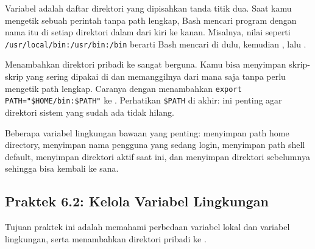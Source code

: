 Variabel  adalah daftar direktori yang dipisahkan tanda titik
dua. Saat kamu mengetik sebuah perintah tanpa path lengkap, Bash mencari
program dengan nama itu di setiap direktori dalam  dari kiri ke
kanan. Misalnya, nilai  seperti
\texttt{/usr/local/bin:/usr/bin:/bin} berarti Bash mencari di
 dulu, kemudian , lalu .

Menambahkan direktori pribadi ke  sangat berguna. Kamu bisa
menyimpan skrip-skrip yang sering dipakai di  dan memanggilnya
dari mana saja tanpa perlu mengetik path lengkap. Caranya dengan menambahkan
\texttt{export PATH="\$HOME/bin:\$PATH"} ke . Perhatikan
\texttt{\$PATH} di akhir: ini penting agar direktori sistem yang sudah ada
tidak hilang.

Beberapa variabel lingkungan bawaan yang penting:  menyimpan path
home directory,  menyimpan nama pengguna yang sedang login,
 menyimpan path shell default,  menyimpan direktori
aktif saat ini, dan  menyimpan direktori sebelumnya sehingga
 bisa kembali ke sana.

\subsection*{Praktek 6.2: Kelola Variabel Lingkungan}

Tujuan praktek ini adalah memahami perbedaan variabel lokal dan
variabel lingkungan, serta menambahkan direktori pribadi ke .

